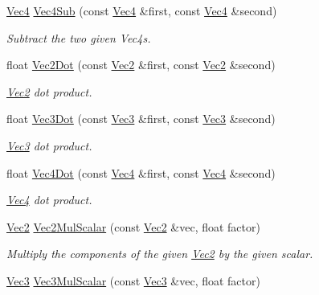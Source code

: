 \begin{DoxyCompactItemize}
\hyperlink{classgofxmath_1_1_vec4}{Vec4} \hyperlink{group___s_i_s_d_vec_math_ga01968b83532d01613a8f89659d4a52dc}{Vec4\+Sub} (const \hyperlink{classgofxmath_1_1_vec4}{Vec4} \&first, const \hyperlink{classgofxmath_1_1_vec4}{Vec4} \&second)
\begin{DoxyCompactList}\small\item\em Subtract the two given Vec4s. \end{DoxyCompactList}\item 
float \hyperlink{group___s_i_s_d_vec_math_gaf722c71a1e9ef7bf97d9489b1cf561e0}{Vec2\+Dot} (const \hyperlink{classgofxmath_1_1_vec2}{Vec2} \&first, const \hyperlink{classgofxmath_1_1_vec2}{Vec2} \&second)
\begin{DoxyCompactList}\small\item\em \hyperlink{classgofxmath_1_1_vec2}{Vec2} dot product. \end{DoxyCompactList}\item 
float \hyperlink{group___s_i_s_d_vec_math_ga02eb26d5238095f747d35890a597e489}{Vec3\+Dot} (const \hyperlink{classgofxmath_1_1_vec3}{Vec3} \&first, const \hyperlink{classgofxmath_1_1_vec3}{Vec3} \&second)
\begin{DoxyCompactList}\small\item\em \hyperlink{classgofxmath_1_1_vec3}{Vec3} dot product. \end{DoxyCompactList}\item 
float \hyperlink{group___s_i_s_d_vec_math_ga2deb01c8dd6f1a06c0a0cfc2e96e9c1e}{Vec4\+Dot} (const \hyperlink{classgofxmath_1_1_vec4}{Vec4} \&first, const \hyperlink{classgofxmath_1_1_vec4}{Vec4} \&second)
\begin{DoxyCompactList}\small\item\em \hyperlink{classgofxmath_1_1_vec4}{Vec4} dot product. \end{DoxyCompactList}\item 
\hyperlink{classgofxmath_1_1_vec2}{Vec2} \hyperlink{group___s_i_s_d_vec_math_ga8e4fd4586284706a28625b0fca6c85e7}{Vec2\+Mul\+Scalar} (const \hyperlink{classgofxmath_1_1_vec2}{Vec2} \&vec, float factor)
\begin{DoxyCompactList}\small\item\em Multiply the components of the given \hyperlink{classgofxmath_1_1_vec2}{Vec2} by the given scalar. \end{DoxyCompactList}\item 
\hyperlink{classgofxmath_1_1_vec3}{Vec3} \hyperlink{group___s_i_s_d_vec_math_ga79475199c50b1ee42edc6aa8b5c5795f}{Vec3\+Mul\+Scalar} (const \hyperlink{classgofxmath_1_1_vec3}{Vec3} \&vec, float factor)

\end{DoxyCompactItemize}
